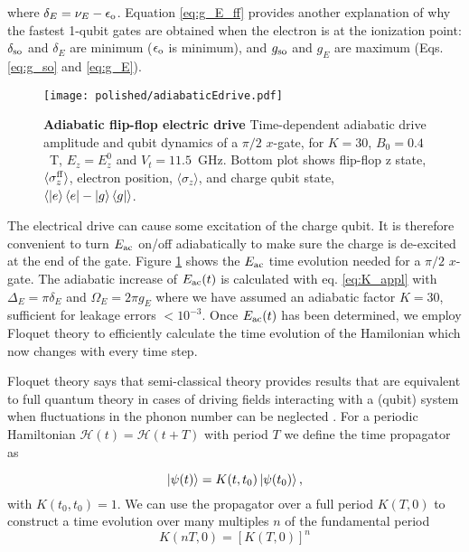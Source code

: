 where $\delta_E=\nu_E-\epsilon_{\rm o}$.
Equation \ref{eq:g_E_ff} provides another explanation of why the fastest 1-qubit gates are obtained when the electron is at the ionization point: $\delta_{\rm so}$ and $\delta_E$ are minimum ($\epsilon_{\rm o}$ is minimum), and $g_{\rm so}$ and $g_E$ are maximum (Eqs. \ref{eq:g_so} and \ref{eq:g_E}).

\begin{figure}[h]
	\centering
	\texttt{[image: polished/adiabaticEdrive.pdf]}
	\caption[Adiabatic flip-flop electric drive]{\textbf{Adiabatic flip-flop electric drive} Time-dependent adiabatic drive amplitude and qubit dynamics of a $\pi/2$ $x$-gate, for $K=30$, $B_0=0.4$~T, $E_z=E_z^0$ and $V_t=11.5$~GHz. Bottom plot shows flip-flop z state, $\langle\sigma_z^{\rm ff}\rangle$, electron position, $\langle\sigma_z\rangle$, and charge qubit state, $\langle\ket{e}\bra{e}-\ket{g}\bra{g}\rangle$.}
		\label{fig:adEdrive}
\end{figure}

The electrical drive can cause some excitation of the charge qubit. It is therefore convenient to turn $E_{\rm ac}$ on/off adiabatically to make sure the charge is de-excited at the end of the gate. Figure \ref{fig:adEdrive} shows the $E_{\rm ac}$ time evolution needed for a $\pi/2$ $x$-gate. The adiabatic increase of $E_{\rm ac}(t)$ is calculated with eq. \eqref{eq:K_appl} with $\Delta_E=\pi\delta_E$ and $\Omega_{E}=2\pi g_E$ where we have assumed an adiabatic factor $K=30$, sufficient for leakage errors $<10^{-3}$. Once $E_{\rm ac}(t)$ has been determined, we employ Floquet theory to efficiently calculate the time evolution of the Hamilonian which now changes with every time step.  

Floquet theory says that semi-classical theory provides results that are equivalent to full quantum theory in cases of driving fields interacting with a (qubit) system when fluctuations in the phonon number can be neglected \cite{Chicone1999}. For a periodic Hamiltonian $\mathcal{H}(t)=\mathcal{H}(t+T)$ with period $T$ we define the time propagator as 

\begin{equation}
\ket{\psi(t)}=K(t,t_0)\ket{\psi(t_0)},
\end{equation}
with $K(t_0,t_0)=1$. We can use the propagator over a full period $K(T,0)$ to construct a time evolution over many multiples $n$ of the fundamental period
\begin{equation}
K(nT,0)=[K(T,0)]^n
\end{equation}

